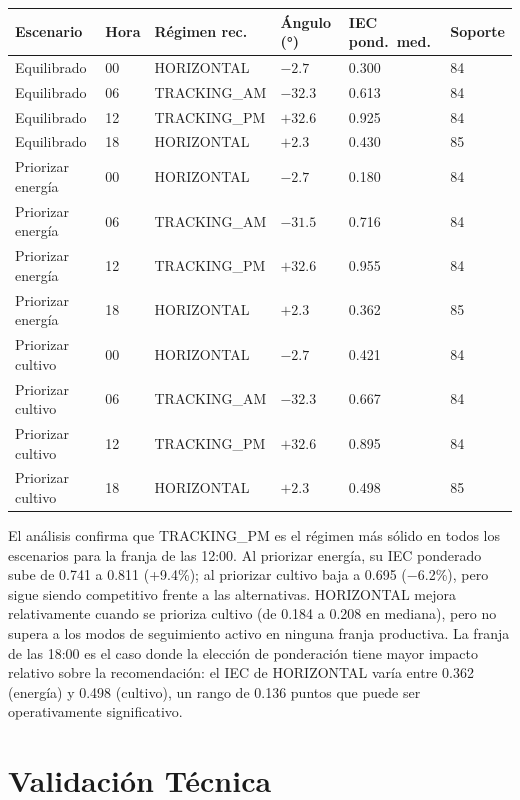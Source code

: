 \documentclass[11pt,a4paper]{article}
\begin{document}
\begin{longtable}{p{} p{} p{} p{} p{} p{}}
\toprule
\textbf{Escenario} & \textbf{Hora} & \textbf{Régimen rec.} & \textbf{Ángulo (°)} & \textbf{IEC pond.\ med.} & \textbf{Soporte} \\
\midrule
Equilibrado       & 00 & HORIZONTAL   & $-2.7$  & 0.300 & 84 \\
Equilibrado       & 06 & TRACKING\_AM & $-32.3$ & 0.613 & 84 \\
Equilibrado       & 12 & TRACKING\_PM & $+32.6$ & 0.925 & 84 \\
Equilibrado       & 18 & HORIZONTAL   & $+2.3$  & 0.430 & 85 \\
\midrule
Priorizar energía & 00 & HORIZONTAL   & $-2.7$  & 0.180 & 84 \\
Priorizar energía & 06 & TRACKING\_AM & $-31.5$ & 0.716 & 84 \\
Priorizar energía & 12 & TRACKING\_PM & $+32.6$ & 0.955 & 84 \\
Priorizar energía & 18 & HORIZONTAL   & $+2.3$  & 0.362 & 85 \\
\midrule
Priorizar cultivo & 00 & HORIZONTAL   & $-2.7$  & 0.421 & 84 \\
Priorizar cultivo & 06 & TRACKING\_AM & $-32.3$ & 0.667 & 84 \\
Priorizar cultivo & 12 & TRACKING\_PM & $+32.6$ & 0.895 & 84 \\
Priorizar cultivo & 18 & HORIZONTAL   & $+2.3$  & 0.498 & 85 \\
\bottomrule
\end{longtable}

El análisis confirma que TRACKING\_PM es el régimen más sólido en todos los escenarios
para la franja de las 12:00. Al priorizar energía, su IEC ponderado sube de 0.741 a 0.811
(+9.4\%); al priorizar cultivo baja a 0.695 ($-$6.2\%), pero sigue siendo competitivo frente
a las alternativas. HORIZONTAL mejora relativamente cuando se prioriza cultivo (de 0.184 a
0.208 en mediana), pero no supera a los modos de seguimiento activo en ninguna franja productiva.
La franja de las 18:00 es el caso donde la elección de ponderación tiene mayor impacto
relativo sobre la recomendación: el IEC de HORIZONTAL varía entre 0.362 (energía) y 0.498
(cultivo), un rango de 0.136 puntos que puede ser operativamente significativo.

\section{Validación Técnica}
\end{document}
